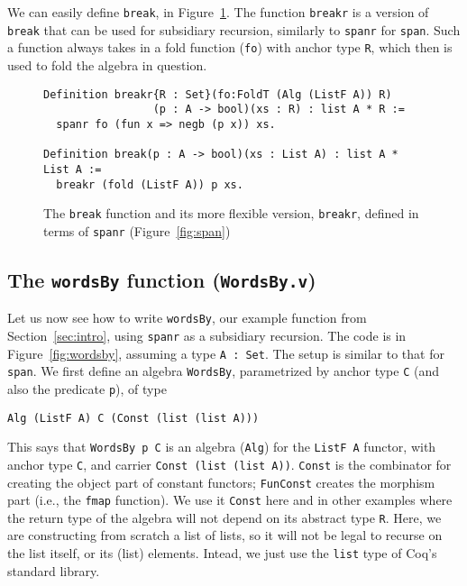 \documentclass[a4paper,USenglish]{lipics-v2021}
\begin{document}
We can easily define \verb|break|, in Figure~\ref{fig:break}.  The
function \verb|breakr| is a version of \verb|break| that can be used
for subsidiary recursion, similarly to \verb|spanr| for \verb|span|.
Such a function always takes in a fold function (\verb|fo|) with
anchor type \verb|R|, which then is used to fold the algebra in
question.

\begin{figure}
\begin{verbatim}
Definition breakr{R : Set}(fo:FoldT (Alg (ListF A)) R)
                 (p : A -> bool)(xs : R) : list A * R :=
  spanr fo (fun x => negb (p x)) xs.

Definition break(p : A -> bool)(xs : List A) : list A * List A :=
  breakr (fold (ListF A)) p xs.
\end{verbatim}
\caption{The \texttt{break} function and its more flexible version, \texttt{breakr}, defined in terms of \texttt{spanr} (Figure~\ref{fig:span})}
\label{fig:break}
\end{figure}

\subsection{The \texttt{wordsBy} function (\texttt{WordsBy.v})}

Let us now see how to write \verb|wordsBy|, our example function from
Section~\ref{sec:intro}, using \verb|spanr| as a subsidiary recursion.
The code is in Figure~\ref{fig:wordsby}, assuming a type
\verb|A : Set|.  The setup is similar to that for \verb|span|.  We first define
an algebra \verb|WordsBy|, parametrized by anchor type \verb|C| (and also
the predicate \verb|p|), of type
\begin{verbatim}
Alg (ListF A) C (Const (list (list A)))
\end{verbatim}
\noindent This says that \verb|WordsBy p C| is an algebra (\verb|Alg|)
for the \verb|ListF A| functor, with anchor type \verb|C|, and carrier
\verb|Const (list (list A))|.  \verb|Const| is the combinator for
creating the object part of constant functors; \verb|FunConst| creates
the morphism part (i.e., the \verb|fmap| function).  We use it
\verb|Const| here and in other examples where the return type of the
algebra will not depend on its abstract type \verb|R|.  Here, we are
constructing from scratch a list of lists, so it will not be legal to
recurse on the list itself, or its (list) elements.  Intead, we just
use the \verb|list| type of Coq's standard library.
\end{document}
